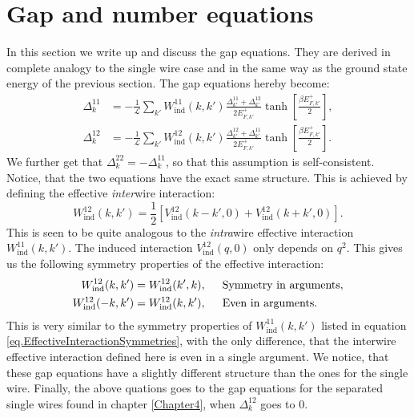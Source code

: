 \section{Gap and number equations}
\label{sec.2wiresgapandnumberequations}
In this section we write up and discuss the gap equations. They are derived in complete analogy to the single wire case and in the same way as the ground state energy of the previous section. The gap equations hereby become:
\begin{align}
\Delta^{11}_k &= -\frac{1}{\mathcal{L}}\sum_{k'} W_{\text{ind}}^{11}(k, k')\frac{\Delta^{11}_{k'} + \Delta^{12}_{k'}}{2E^{+}_{F,k'}}\tanh\left[\frac{\beta E^{+}_{F,k'}}{2}\right], \nonumber \\
\Delta^{12}_k &= -\frac{1}{\mathcal{L}}\sum_{k'} W_{\text{ind}}^{12}(k, k')\frac{\Delta^{12}_{k'} + \Delta^{11}_{k'}}{2E^{+}_{F,k'}}\tanh\left[\frac{\beta E^{+}_{F,k'}}{2}\right].
\label{eq.2wiresgapequations}
\end{align}
We further get that $\Delta^{22}_k = - \Delta^{11}_k$, so that this assumption is self-consistent. Notice, that the two equations have the exact same structure. This is achieved by defining the effective \textit{inter}wire interaction: 
\begin{equation}
W_{\text{ind}}^{12}(k, k') = \frac{1}{2}\left[V_{\text{ind}}^{12}(k - k', 0) + V_{\text{ind}}^{12}(k + k', 0) \right].
\end{equation}
This is seen to be quite analogous to the \textit{intra}wire effective interaction $W_{\text{ind}}^{11}(k, k')$. The induced interaction $V_{\text{ind}}^{12}(q, 0)$ only depends on $q^2$. This gives us the following symmetry properties of the effective interaction:
\begin{align}
W_{\text{ind}}^{12}(k,k')   &= W_{\text{ind}}^{12}(k',k), \hspace{0.5cm} \text{Symmetry in arguments}, \nonumber \\
W_{\text{ind}}^{12}(-k,k')  &= W_{\text{ind}}^{12}(k,k'), \hspace{0.5cm} \text{Even in arguments}.
\label{eq.EffectiveInterwireInteractionSymmetries}
\end{align}
This is very similar to the symmetry properties of $W_{\text{ind}}^{11}(k, k')$ listed in equation \ref{eq.EffectiveInteractionSymmetries}, with the only difference, that the interwire effective interaction defined here is even in a single argument. We notice, that these gap equations have a slightly different structure than the ones for the single wire. Finally, the above quations goes to the gap equations for the separated single wires found in chapter \ref{Chapter4}, when $\Delta^{12}_k$ goes to $0$.   	

